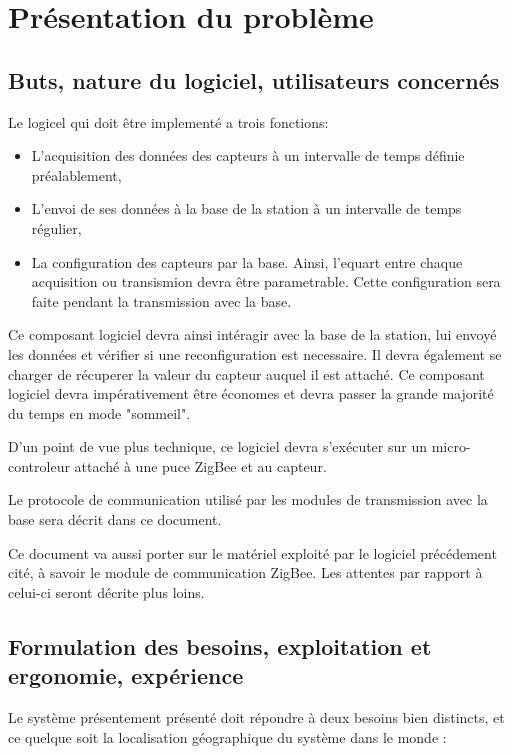 \section{Présentation du problème}

\subsection{Buts, nature du logiciel, utilisateurs concernés}

Le logicel qui doit être implementé a trois fonctions:
\begin{itemize}
\item L'acquisition des données des capteurs à un intervalle de temps définie préalablement,
\item L'envoi de ses données à la base de la station à un intervalle de temps régulier,
\item La configuration des capteurs par la base. Ainsi, l'equart entre chaque acquisition ou transismion devra être parametrable. Cette configuration sera faite pendant la transmission avec la base.
\end{itemize}

Ce composant logiciel devra ainsi intéragir avec la base de la station, lui envoyé les données et vérifier si une reconfiguration est necessaire. Il devra également se charger de récuperer la valeur du capteur auquel il est attaché. Ce composant logiciel devra impérativement être économes et devra passer la grande majorité du temps en mode "sommeil".

D'un point de vue plus technique, ce logiciel devra s'exécuter sur un micro-controleur attaché à une puce ZigBee et au capteur.

Le protocole de communication utilisé par les modules de transmission avec la base sera décrit dans ce document.

Ce document va aussi porter sur le matériel exploité par le logiciel précédement cité, à savoir le module de communication ZigBee. Les attentes par rapport à celui-ci seront décrite plus loins.

\subsection{Formulation des besoins, exploitation et ergonomie, expérience}

Le système présentement présenté doit répondre à deux besoins bien distincts, et ce quelque soit la localisation géographique du système dans le monde :

